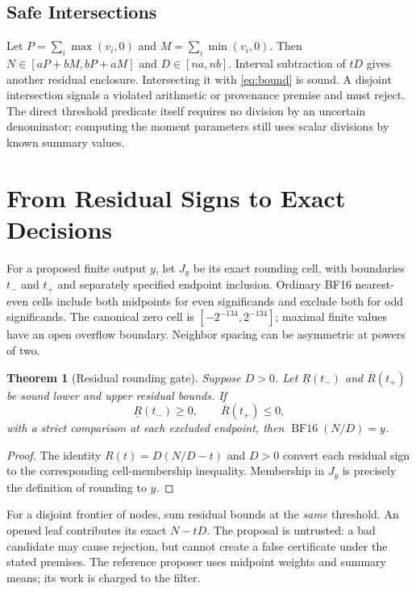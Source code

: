 \documentclass{article}
\theoremstyle{plain}
\newtheorem{theorem}{Theorem}
\theoremstyle{definition}
\theoremstyle{remark}
\newcommand{\BF}{\operatorname{BF16}}
\begin{document}
\subsection{Safe Intersections}

Let $P=\sum_i\max(v_i,0)$ and $M=\sum_i\min(v_i,0)$. Then
$N\in[aP+bM,bP+aM]$ and $D\in[na,nb]$. Interval subtraction
of $tD$ gives another residual enclosure. Intersecting it with
\cref{eq:bound} is sound. A disjoint intersection signals a violated
arithmetic or provenance premise and must reject. The direct threshold
predicate itself requires no division by an uncertain denominator; computing
the moment parameters still uses scalar divisions by known summary values.

\section{From Residual Signs to Exact Decisions}
\label{sec:gates}

For a proposed finite output $y$, let $J_y$ be its exact rounding cell, with
boundaries $t_-$ and $t_+$ and separately specified endpoint inclusion.
Ordinary BF16 nearest-even cells include both midpoints for even
significands and exclude both for odd significands. The canonical zero cell
is $[-2^{-134},2^{-134}]$; maximal finite values have an open overflow
boundary. Neighbor spacing can be asymmetric at powers of two.

\begin{theorem}[Residual rounding gate]
\label{thm:gate}
Suppose $D>0$. Let $\underline R(t_-)$ and $\overline R(t_+)$ be sound
lower and upper residual bounds. If
\begin{equation}
 \underline R(t_-)\ge0,\qquad \overline R(t_+)\le0,
 \label{eq:gate}
\end{equation}
with a strict comparison at each excluded endpoint, then $\BF(N/D)=y$.
\end{theorem}
\begin{proof}
The identity $R(t)=D(N/D-t)$ and $D>0$ convert each residual sign to
the corresponding cell-membership inequality. Membership in $J_y$ is
precisely the definition of rounding to $y$.
\end{proof}

For a disjoint frontier of nodes, sum residual bounds at the \emph{same}
threshold. An opened leaf contributes its exact $N-tD$. The proposal is
untrusted: a bad candidate may cause rejection, but cannot create a false
certificate under the stated premises. The reference proposer uses midpoint
weights and summary means; its work is charged to the filter.
\end{document}
